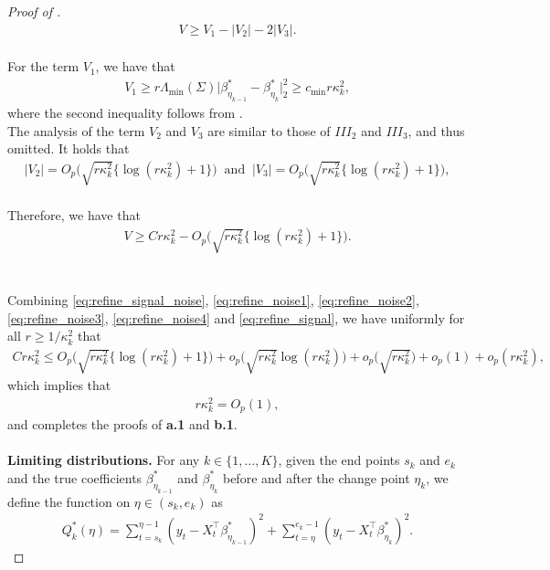 \documentclass[11pt]{article}
\theoremstyle{plain}
\theoremstyle{definition}
\begin{document}
\begin{proof}[Proof of ]
\begin{align*}
    V \geq V_1 - |V_2| - 2|V_3|.
\end{align*}
\
\\
For the term $V_1$, we have that
\begin{align*}
    V_1 \geq r\Lambda_{\min}(\Sigma)\big|\beta^*_{\eta_{k-1}} - \beta^*_{\eta_{k}}\big|_2^2 \geq c_{\min}r\kappa_k^2,
\end{align*}
where the second inequality follows from .
\
\\
The analysis of the term $V_2$ and $V_3$ are similar to those of $III_2$ and $III_3$, and thus omitted.
It holds that
\begin{align*}
    |V_2| = O_p\big(\sqrt{r\kappa_k^2}\{\log(r\kappa_k^2) + 1\}\big) \;\; \text{and} \;\;
    |V_3| = O_p\big(\sqrt{r\kappa_k^2}\{\log(r\kappa_k^2) + 1\}\big),
\end{align*}
\
\\
Therefore, we have that
\begin{align}\label{eq:refine_signal}
    V \geq Cr\kappa_k^2 - O_p\big(\sqrt{r\kappa_k^2}\{\log(r\kappa_k^2) + 1\}\big).
\end{align}
\\
\\
Combining \eqref{eq:refine_signal_noise}, \eqref{eq:refine_noise1}, \eqref{eq:refine_noise2}, \eqref{eq:refine_noise3}, \eqref{eq:refine_noise4} and \eqref{eq:refine_signal}, we have uniformly for all $r \geq 1/\kappa_k^2$ that
\begin{align*}
    Cr\kappa_k^2 \leq O_p\big(\sqrt{r\kappa_k^2}\{\log(r\kappa_k^2) + 1\}\big) + o_p\big(\sqrt{r\kappa_k^2}\log(r\kappa_k^2) \big) + o_p\Big(\sqrt{r\kappa_k^2}\Big) + o_p(1) + o_p(r\kappa_k^2),
\end{align*}
which implies that
\begin{align*}
    r\kappa_k^2 = O_p(1),
\end{align*}
and completes the proofs of \textbf{a.1} and \textbf{b.1}.
\\
\\
\textbf{Limiting distributions.}
For any $k \in \{1, \dots, K\}$, given the end points $s_k$ and $e_k$ and the true coefficients $\beta_{\eta_{k-1}}^*$ and $\beta_{\eta_k}^*$ before and after the change point $\eta_k$, we define the function on $\eta \in (s_k, e_k)$ as  
\begin{align}\label{eq:loss_unknown}
    Q_k^*(\eta) = \sum_{t = s_k}^{\eta-1} (y_t - X_t^{\top}\beta_{\eta_{k-1}}^*)^2 + \sum_{t = \eta}^{e_k-1} (y_t - X_t^{\top}\beta_{\eta_{k}}^*)^2.
\end{align}

\end{proof}
\end{document}
